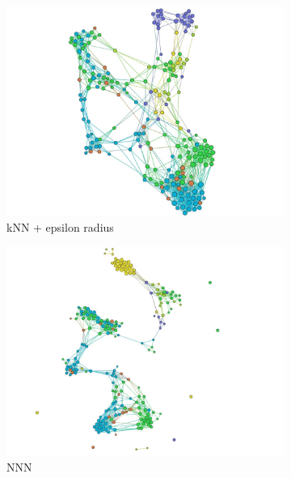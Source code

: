 \documentclass[slovak,master,dept460,male,cpp,cpdeclaration]{diploma}
\begin{document}
\begin{figure}[H]
\centering
\begin{subfigure}{0.45\textwidth}
    \centering
    \includegraphics[width=\linewidth, frame]{Graphs/network_glass_knn_epsilon.jpg}
    \caption{kNN + epsilon radius}
    \label{fig:wine_knn_eps}
\end{subfigure}\hfil
\begin{subfigure}{0.45\textwidth}
    \centering
    \includegraphics[width=\linewidth, frame]{Graphs/network_glass_nnn.jpg}
    \caption{NNN}
    \label{fig:wine_nnn}
\end{subfigure}
\medskip
\begin{subfigure}{0.45\textwidth}
    \centering

\end{subfigure}
\end{figure}
\end{document}
